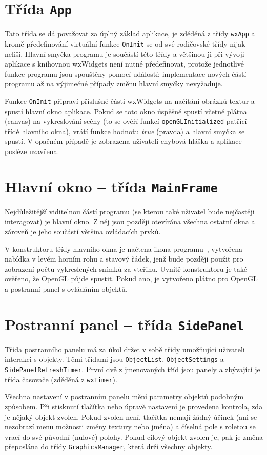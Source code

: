 \documentclass[a4paper, 11pt]{report}
\begin{document}
\section{Třída \texttt{App}}
Tato třída se dá považovat za úplný základ aplikace, je zděděná z třídy \texttt{wxApp} a kromě předefinování virtuální funkce \texttt{OnInit} se od své rodičovské třídy nijak neliší. Hlavní smyčka programu je součástí této třídy a většinou ji při vývoji aplikace s knihovnou wxWidgets není nutné předefinovat, protože jednotlivé funkce programu jsou spouštěny pomocí událostí; implementace nových částí programu až na výjimečné případy změnu hlavní smyčky nevyžaduje.

Funkce \texttt{OnInit} připraví příslušné části wxWidgets na načítání obrázků textur a spustí hlavní okno aplikace. Pokud se toto okno úspěšně spustí včetně plátna (canvas) na vykreslování scény (to se ověří funkcí \texttt{openGLInitialized} patřící třídě hlavního okna), vrátí funkce hodnotu \emph{true} (pravda) a hlavní smyčka se spustí. V opačném případě je zobrazena uživateli chybová hláška a aplikace posléze uzavřena.

\section{Hlavní okno -- třída \texttt{MainFrame}}
Nejdůležitější viditelnou částí programu (se kterou také uživatel bude nejčastěji interagovat) je hlavní okno. Z něj jsou později otevírána všechna ostatní okna a zároveň je jeho součástí většina ovládacích prvků.

V konstruktoru třídy hlavního okna je načtena ikona programu~\cite{pic:icon}, vytvořena nabídka v levém horním rohu a stavový řádek, jenž bude později použit pro zobrazení počtu vykreslených snímků za vteřinu. Uvnitř konstruktoru je také ověřeno, že OpenGL půjde spustit. Pokud ano, je vytvořeno plátno pro OpenGL a postranní panel s ovládáním objektů.

\section{Postranní panel -- třída \texttt{SidePanel}}
Třída postranního panelu má za úkol držet v sobě třídy umožňující uživateli interakci s objekty. Těmi třídami jsou \texttt{ObjectList}, \texttt{ObjectSettings} a \texttt{SidePanelRefreshTimer}. První dvě z jmenovaných tříd jsou panely a zbývající je třída časovače (zděděná z \texttt{wxTimer}).

Všechna nastavení v postranním panelu mění parametry objektů podobným způsobem. Při stisknutí tlačítka nebo úpravě nastavení je provedena kontrola, zda je nějaký objekt zvolen. Pokud zvolen není, tlačítka nemají žádný účinek (ani se nezobrazí menu možnosti změny textury nebo jména) a číselná pole s roletou se vrací do své původní (nulové) polohy. Pokud cílový objekt zvolen je, pak je změna přeposlána do třídy \texttt{GraphicsManager}, která drží všechny objekty.
\end{document}

